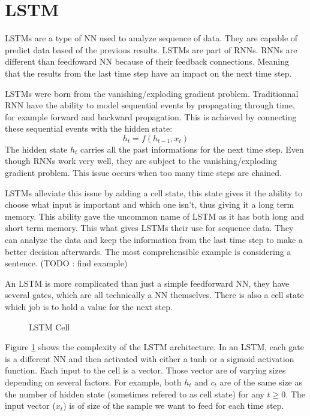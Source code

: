 \section{LSTM}\label{sec:lstm}
\acp{LSTM} are a type of \ac{NN} used to analyze sequence of data. They are capable of predict data based of the previous results. \acp{LSTM} are part of \acp{RNN}. \acp{RNN} are different than feedfoward \acl{NN} because of their feedback connections. Meaning that the results from the last time step have an impact on the next time step.

\acp{LSTM} were born from the vanishing/exploding gradient problem. Traditionnal \ac{RNN} have the ability to model sequential events by propagating through time, for example forward and backward propagation. This is achieved by connecting these sequential events with the hidden state:
$$h_t=f(h_{t-1},x_t)$$
The hidden state $h_t$ carries all the past informations for the next time step.
Even though \acp{RNN} work very well, they are subject to the vanishing/exploding gradient problem. This issue occurs when too many time steps are chained.

\acp{LSTM} alleviate this issue by adding a cell state, this state gives it the ability to choose what input is important and which one isn't, thus giving it a long term memory. This ability gave the uncommon name of \acl{LSTM} as it has both long and short term memory. This what gives \acp{LSTM} their use for sequence data. They can analyze the data and keep the information from the last time step to make a better decision afterwards. The most comprehensible example is considering a sentence. (TODO : find example)

An \ac{LSTM} is more complicated than just a simple feedforward \acl{NN}, they have several gates, which are all technically a \ac{NN} themselves. There is also a cell state which job is to hold a value for the next step.

\begin{figure}[H]
  \centering
  
  \caption{LSTM Cell}
  \label{fig:lstmCell}
\end{figure}

Figure \ref{fig:lstmCell} shows the complexity of the \ac{LSTM} architecture. In an \ac{LSTM}, each gate is a different \ac{NN} and then activated with either a tanh or a sigmoid activation function. Each input to the cell is a vector.
Those vector are of varying sizes depending on several factors. For example, both $h_t$ and $c_t$ are of the same size as the number of hidden state (sometimes refered to as cell state) for any $t\geq 0$.
The input vector ($x_t$) is of size of the sample we want to feed for each time step.

